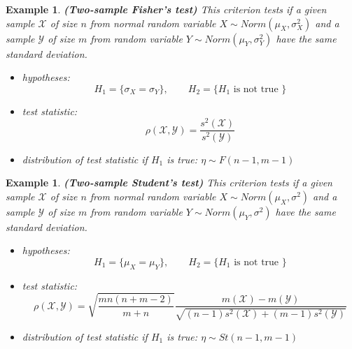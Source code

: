 \documentclass[12pt]{article}
\newtheorem{example}[theorem]{Example}
\begin{document}
\begin{example} \textbf{(Two-sample Fisher's test)} This criterion tests if a given sample $\mathscr{X}$ of size $n$ from normal random variable $X\sim Norm(\mu_X,\sigma_X^2)$ and a sample $\mathscr{Y}$ of size $m$ from random variable $Y\sim Norm(\mu_Y,\sigma_Y^2)$ have the same standard deviation.
\begin{itemize}
    \item hypotheses: 
    $$H_1=\{\sigma_X=\sigma_Y\},\quad\quad H_2=\{H_1\mbox{ is not true }\}$$
    \item test statistic: 
    $$\rho(\mathscr{X},\mathscr{Y})=\frac{s^2(\mathscr{X})}{s^2(\mathscr{Y})}$$
    \item distribution of test statistic if $H_1$ is true: $\eta\sim F(n-1,m-1)$
\end{itemize}
\end{example}

\begin{example} \textbf{(Two-sample Student's test)} This criterion tests if a given sample $\mathscr{X}$ of size $n$ from normal random variable $X\sim Norm(\mu_X,\sigma^2)$ and a sample $\mathscr{Y}$ of size $m$ from random variable $Y\sim Norm(\mu_Y,\sigma^2)$ have the same standard deviation.
\begin{itemize}
    \item hypotheses: 
    $$H_1=\{\mu_X=\mu_Y\},\quad\quad H_2=\{H_1\mbox{ is not true }\}$$
    \item test statistic: 
    $$\rho(\mathscr{X},\mathscr{Y})=\sqrt{\frac{mn(n+m-2)}{m+n}}\frac{m(\mathscr{X})-m(\mathscr{Y})}{\sqrt{(n-1)s^2(\mathscr{X})+(m-1)s^2(\mathscr{Y})}}$$
    \item distribution of test statistic if $H_1$ is true: $\eta\sim St(n-1,m-1)$
\end{itemize}
\end{example}
\end{document}
